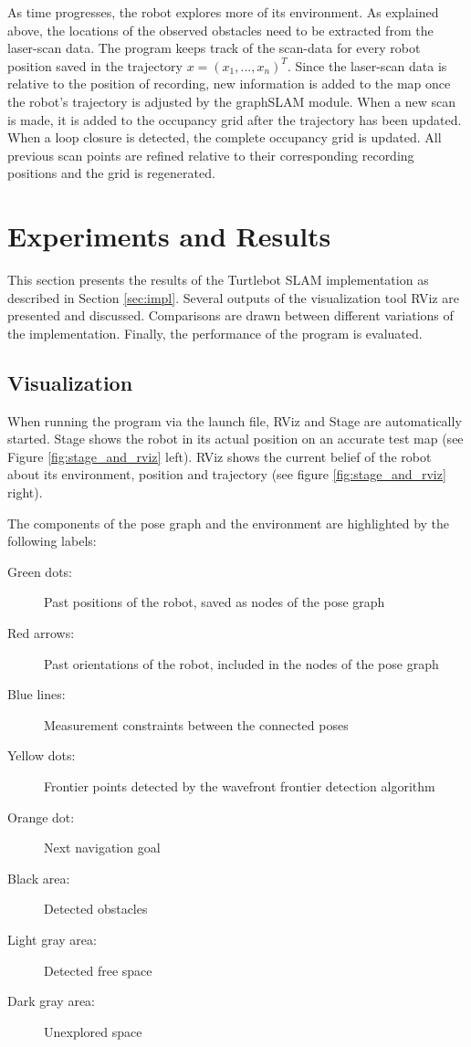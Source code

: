 \documentclass{ba-kecs}
\begin{document}
As time progresses, the robot explores more of its environment. As explained above, the locations of the observed obstacles need to be extracted from the laser-scan data. The program keeps track of the scan-data for every robot position saved in the trajectory \(x = (x_1, ..., x_n)^T \). Since the laser-scan data is relative to the position of recording, new information is added to the map once the robot's trajectory is adjusted by the graphSLAM module. When a new scan is made, it is added to the occupancy grid after the trajectory has been updated. When a loop closure is detected, the complete occupancy grid is updated. All previous scan points are refined relative to their corresponding recording positions and the grid is regenerated.

\section{Experiments and Results}
\label{sec:exp}
This section presents the results of the Turtlebot SLAM implementation as described in Section \ref{sec:impl}. Several outputs of the visualization tool RViz are presented and discussed. Comparisons are drawn between different variations of the implementation. Finally, the performance of the program is evaluated.

\subsection{Visualization}
When running the program via the launch file, RViz and Stage are automatically started. Stage shows the robot in its actual position on an accurate test map (see Figure \ref{fig:stage_and_rviz} left). RViz shows the current belief of the robot about its environment, position and trajectory (see figure \ref{fig:stage_and_rviz} right).

The components of the pose graph and the environment are highlighted by the following labels:

\begin{description}
\item[Green dots:]Past positions of the robot, saved as nodes of the pose graph
\item[Red arrows:]Past orientations of the robot, included in the nodes of the pose graph
\item[Blue lines:]Measurement constraints between the connected poses
\item[Yellow dots:]Frontier points detected by the wavefront frontier detection algorithm
\item[Orange dot:]Next navigation goal
\item[Black area:]Detected obstacles
\item[Light gray area:]Detected free space
\item[Dark gray area:]Unexplored space
\end{description}
\end{document}
